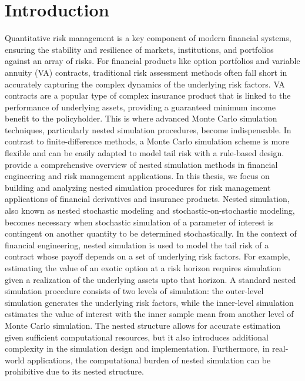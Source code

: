 \chapter{Introduction}

Quantitative risk management is a key component of modern financial systems, ensuring the stability and resilience of markets, institutions, and portfolios against an array of risks. 
For financial products like option portfolios and variable annuity (VA) contracts, traditional risk assessment methods often fall short in accurately capturing the complex dynamics of the underlying risk factors.
VA contracts are a popular type of complex insurance product that is linked to the performance of underlying assets, providing a guaranteed minimum income benefit to the policyholder.
This is where advanced Monte Carlo simulation techniques, particularly nested simulation procedures, become indispensable.
In contrast to finite-difference methods, a Monte Carlo simulation scheme is more flexible and can be easily adapted to model tail risk with a rule-based design.
~\cite{glasserman2004monte} provide a comprehensive overview of nested simulation methods in financial engineering and risk management applications.
In this thesis, we focus on building and analyzing nested simulation procedures for risk management applications of financial derivatives and insurance products.
Nested simulation, also known as nested stochastic modeling and stochastic-on-stochastic modeling, becomes necessary when stochastic simulation of a parameter of interest is contingent on another quantity to be determined stochastically.
In the context of financial engineering, nested simulation is used to model the tail risk of a contract whose payoff depends on a set of underlying risk factors.
For example, estimating the value of an exotic option at a risk horizon requires simulation given a realization of the underlying assets upto that horizon.
A standard nested simulation procedure consists of two levels of simulation: the outer-level simulation generates the underlying risk factors, while the inner-level simulation estimates the value of interest with the inner sample mean from another level of Monte Carlo simulation.
The nested structure allows for accurate estimation given sufficient computational resources, but it also introduces additional complexity in the simulation design and implementation.
Furthermore, in real-world applications, the computational burden of nested simulation can be prohibitive due to its nested structure.
